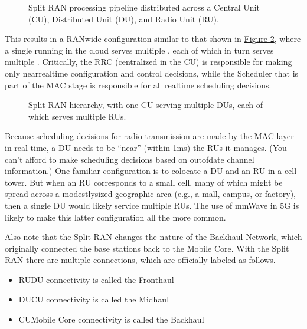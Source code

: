 \documentclass[a4paper,11pt,english]{sphinxmanual}
\let\sphinxpxdimen\pdfpxdimen\else\newdimen\sphinxpxdimen
\begin{document}
\begin{figure}[ht]
\centering
\capstart

\noindent\sphinxincludegraphics[width=600\sphinxpxdimen]{{Slide24}.png}
\caption{Split RAN processing pipeline distributed across a
Central Unit (CU), Distributed Unit (DU), and Radio Unit (RU).}\label{\detokenize{ran:id6}}\label{\detokenize{ran:fig-split-ran}}\end{figure}

\sphinxAtStartPar
This results in a RAN\sphinxhyphen{}wide configuration similar to that shown in
\hyperref[\detokenize{ran:fig-ran-hierarchy}]{Figure \ref{\detokenize{ran:fig-ran-hierarchy}}}, where a single  running in the cloud serves multiple ,
each of which in turn serves multiple . Critically,
the RRC (centralized in the CU) is responsible for making only
near\sphinxhyphen{}real\sphinxhyphen{}time configuration and control decisions, while the
Scheduler that is part of the MAC stage is responsible for all
real\sphinxhyphen{}time scheduling decisions.

\begin{figure}[ht]
\centering
\capstart

\noindent\sphinxincludegraphics[width=400\sphinxpxdimen]{{Slide32}.png}
\caption{Split RAN hierarchy, with one CU serving multiple DUs,
each of which serves multiple RUs.}\label{\detokenize{ran:id7}}\label{\detokenize{ran:fig-ran-hierarchy}}\end{figure}

\sphinxAtStartPar
Because scheduling decisions for radio transmission are made by the
MAC layer in real time, a DU needs to be “near” (within 1ms) the RUs
it manages. (You can’t afford to make scheduling decisions based on
out\sphinxhyphen{}of\sphinxhyphen{}date channel information.) One familiar configuration is to
co\sphinxhyphen{}locate a DU and an RU in a cell tower. But when an RU corresponds
to a small cell, many of which might be spread across a modestly\sphinxhyphen{}sized
geographic area (e.g., a mall, campus, or factory), then a single DU
would likely service multiple RUs. The use of mmWave in 5G is likely
to make this latter configuration all the more common.

\sphinxAtStartPar
Also note that the Split RAN changes the nature of the Backhaul
Network, which originally connected the base stations back to the
Mobile Core. With the Split RAN there are multiple connections, which
are officially labeled as follows.
\begin{itemize}
\item {} 
\sphinxAtStartPar
RU\sphinxhyphen{}DU connectivity is called the Fronthaul

\item {} 
\sphinxAtStartPar
DU\sphinxhyphen{}CU connectivity is called the Midhaul

\item {} 
\sphinxAtStartPar
CU\sphinxhyphen{}Mobile Core connectivity is called the Backhaul

\end{itemize}
\end{document}

